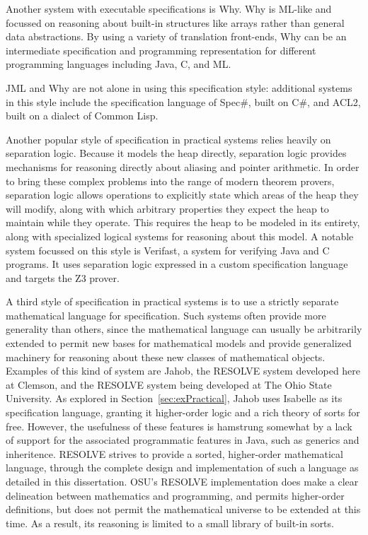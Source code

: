 Another system with executable specifications is Why\cite{bobotWhy}.  Why is ML-like and focussed on reasoning about built-in structures like arrays rather than general data abstractions.  By using a variety of translation front-ends, Why can be an intermediate specification and programming representation for different programming languages including Java, C, and ML\cite{something}.

JML and Why are not alone in using this specification style: additional systems in this style include the specification language of Spec\#\cite{specsharp}, built on C\#, and ACL2\cite{kaufmannACL2}, built on a dialect of Common Lisp.

Another popular style of specification in practical systems relies heavily on separation logic\cite{reynoldsSeparationLogic}.  Because it models the heap directly, separation logic provides mechanisms for reasoning directly about aliasing and pointer arithmetic.  In order to bring these complex problems into the range of modern theorem provers, separation logic allows operations to explicitly state which areas of the heap they will modify, along with which arbitrary properties they expect the heap to maintain while they operate.  This requires the heap to be modeled in its entirety, along with specialized logical systems for reasoning about this model.  A notable system focussed on this style is Verifast\cite{jacobsVerifast}, a system for verifying Java and C programs.  It uses separation logic expressed in a custom specification language and targets the Z3 prover\cite{something}.

A third style of specification in practical systems is to use a strictly separate mathematical language for specification.  Such systems often provide more generality than others, since the mathematical language can usually be arbitrarily extended to permit new bases for mathematical models and provide generalized machinery for reasoning about these new classes of mathematical objects.  Examples of this kind of system are Jahob, the RESOLVE system developed here at Clemson, and the RESOLVE system being developed at The Ohio State University.  As explored in Section~\ref{sec:exPractical}, Jahob uses Isabelle as its specification language, granting it higher-order logic and a rich theory of sorts for free.  However, the usefulness of these features is hamstrung somewhat by a lack of support for the associated programmatic features in Java, such as generics and inheritence.  RESOLVE strives to provide a sorted, higher-order mathematical language, through the complete design and implementation of such a language as detailed in this dissertation.  OSU's RESOLVE implementation does make a clear delineation between mathematics and programming, and permits higher-order definitions, but does not permit the mathematical universe to be extended at this time.  As a result, its reasoning is limited to a small library of built-in sorts.

